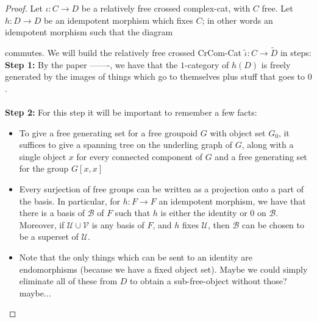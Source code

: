 \documentclass[12pt]{article}
\theoremstyle{definition}
\begin{document}
	\begin{proof}
		Let $\iota: C \to D$ be a relatively free crossed complex-cat, with $C$ free. Let $h: D \to D$ be an idempotent morphism which fixes $C$; in other words an idempotent morphism such that the diagram
		\begin{center}
		\end{center}
		commutes. We will build the relatively free crossed CrCom-Cat $\tilde{\iota}: C \to \tilde{D}$ in steps:\\
		\textbf{Step 1:} By the paper -------, we have that the $1$-category of $h(D)$ is freely generated by the images of things which go to themselves plus stuff that goes to $0$.  \\\\
		\textbf{Step 2:} For this step it will be important to remember a few facts: 
		\begin{itemize}
			\item To give a free generating set for a free groupoid $G$ with object set $G_0$, it suffices to give a spanning tree on the underling graph of $G$, along with a single object $x$ for every connected component of $G$ and a free generating set for the group $G[x,x]$
			\item Every surjection of free groups can be written as a projection onto a part of the basis. In particular, for $h: F \to F$ an idempotent morphism, we have that there is a basis of $\mathcal{B}$ of $F$ such that $h$ is either the identity or $0$ on $\mathcal{B}$. 
			Moreover, if $\mathcal{U} \cup \mathcal{V}$ is any basis of $F$, and $h$ fixes $\mathcal{U}$, then $\mathcal{B}$ can be chosen to be a superset of $\mathcal{U}$.
			\item Note that the only things which can be sent to an identity are endomorphisms (because we have a fixed object set). Maybe we could simply eliminate all of these from $D$ to obtain a sub-free-object without those? maybe...  
		\end{itemize}
		
		
	\end{proof}
\end{document}
